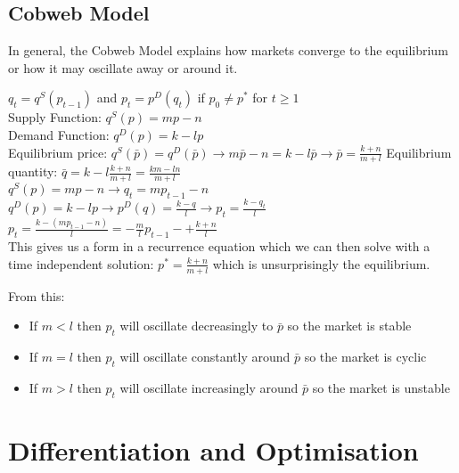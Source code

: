 \documentclass[12pt, letterpaper]{article}
\begin{document}
\subsection{Cobweb Model}
In general, the Cobweb Model explains how markets converge to the equilibrium or how it may oscillate away or around it.
\begin{center}
	$q_t=q^S(p_{t-1})$ and $p_t=p^D(q_t)$ if $p_0 \neq p^*$ for $t \geq 1$\\
	Supply Function: $q^S(p) = mp-n$\\
	Demand Function: $q^D(p) = k-lp$\\
	Equilibrium price: $q^S(\bar{p}) = q^D(\bar{p}) \rightarrow m\bar{p} -n = k - l\bar{p} \rightarrow \bar{p} = \frac{k+n}{m+l}$
	Equilibrium quantity: $\bar{q} = k - l\frac{k+n}{m+l} = \frac{km-ln}{m+l}$\\
	$q^S(p) = mp-n \rightarrow q_t = mp_{t-1} - n$\\
	$q^D(p) = k-lp \rightarrow p^D(q)=\frac{k-q}{l} \rightarrow p_t = \frac{k-q_t}{l}$\\
	$p_t = \frac{k-(mp_{t-1}-n)}{l} = -\frac{m}{l}p_{t-1}-+\frac{k+n}{l}$\\
	This gives us a form in a recurrence equation which we can then solve with a time independent solution: $p^* = \frac{k+n}{m+l}$ which is unsurprisingly the equilibrium.
\end{center}
From this:
\begin{itemize}
	\item If $m < l$ then $p_t$ will oscillate decreasingly to $\bar{p}$ so the market is stable
	\item If $m = l$ then $p_t$ will oscillate constantly around $\bar{p}$ so the market is cyclic
	\item If $m > l$ then $p_t$ will oscillate increasingly around $\bar{p}$ so the market is unstable
\end{itemize}

\section{Differentiation and Optimisation}
\end{document}
